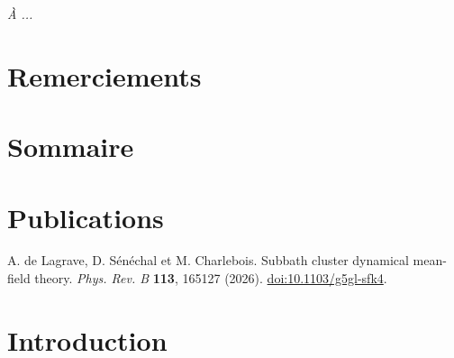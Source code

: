 \documentclass[titlepage, oneside, letterpaper, 11pt]{book} %
\begin{document}

    

    \newpage
    \thispagestyle{empty}
    \mbox{}

    \frontmatter

    

    \newpage
    \vglue 5cm
    \begin{flushright}
        \textit{À ...} \\
    \end{flushright}

    \newpage
    \thispagestyle{empty}
    \mbox{}

    \chapter{Remerciements}
    
    \clearpage

    \newpage
    \chapter*{Sommaire}
    

    {
        \setlength{\parskip}{0ex}
        \tableofcontents
        \clearpage
        \listoffigures
        \clearpage
    }

    \chapter{Publications}
    \begin{enumerate}[label={[\arabic*]}, leftmargin=2em]
        \item A. de Lagrave, D. Sénéchal et M. Charlebois. Subbath cluster
            dynamical mean-field theory. \textit{Phys. Rev. B} \textbf{113},
            165127 (2026).
            \href{http://dx.doi.org/10.1103/g5gl-sfk4}{doi:10.1103/g5gl-sfk4}.
    \end{enumerate}
    \clearpage

    \mainmatter

    \chapter*{Introduction}
    
\end{document}
